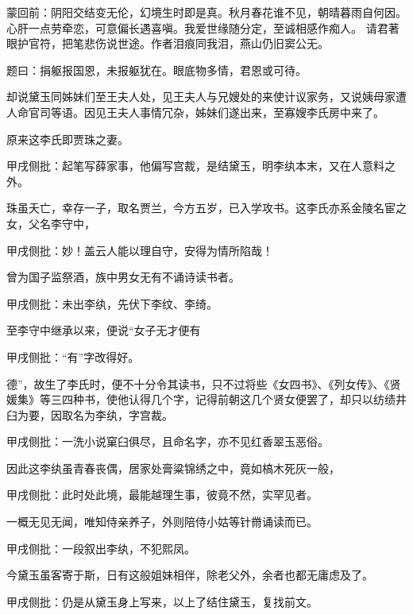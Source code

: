 
\begin{parag}
    \begin{note}蒙回前：阴阳交结变无伦，幻境生时即是真。秋月春花谁不见，朝晴暮雨自何因。心肝一点劳牵恋，可意偏长遇喜嗔。我爱世缘随分定，至诚相感作痴人。
        请君著眼护官符，把笔悲伤说世途。作者泪痕同我泪，燕山仍旧窦公无。\end{note}
\end{parag}
\begin{note}
    题曰：捐躯报国恩，未报躯犹在。眼底物多情，君恩或可待。
\end{note}

\begin{parag}
    却说黛玉同姊妹们至王夫人处，见王夫人与兄嫂处的来使计议家务，又说姨母家遭人命官司等语。因见王夫人事情冗杂，姊妹们遂出来，至寡嫂李氏房中来了。
\end{parag}


\begin{parag}
    原来这李氏即贾珠之妻。\begin{note}甲戌侧批：起笔写薛家事，他偏写宫裁，是结黛玉，明李纨本末，又在人意料之外。\end{note}珠虽夭亡，幸存一子，取名贾兰，今方五岁，已入学攻书。这李氏亦系金陵名宦之女，父名李守中，\begin{note}甲戌侧批：妙！盖云人能以理自守，安得为情所陷哉！\end{note}曾为国子监祭酒，族中男女无有不诵诗读书者。\begin{note}甲戌侧批：未出李纨，先伏下李纹、李绮。\end{note}至李守中继承以来，便说“女子无才便有\begin{note}甲戌侧批：“有”字改得好。\end{note}德”，故生了李氏时，便不十分令其读书，只不过将些《女四书》、《列女传》、《贤媛集》等三四种书，使他认得几个字，记得前朝这几个贤女便罢了，却只以纺绩井臼为要，因取名为李纨，字宫裁。\begin{note}甲戌侧批：一洗小说窠臼俱尽，且命名字，亦不见红香翠玉恶俗。\end{note}因此这李纨虽青春丧偶，居家处膏粱锦绣之中，竟如槁木死灰一般，\begin{note}甲戌侧批：此时处此境，最能越理生事，彼竟不然，实罕见者。\end{note}一概无见无闻，唯知侍亲养子，外则陪侍小姑等针黹诵读而已。\begin{note}甲戌侧批：一段叙出李纨，不犯熙凤。\end{note}今黛玉虽客寄于斯，日有这般姐妹相伴，除老父外，余者也都无庸虑及了。\begin{note}甲戌侧批：仍是从黛玉身上写来，以上了结住黛玉，复找前文。\end{note}
\end{parag}


